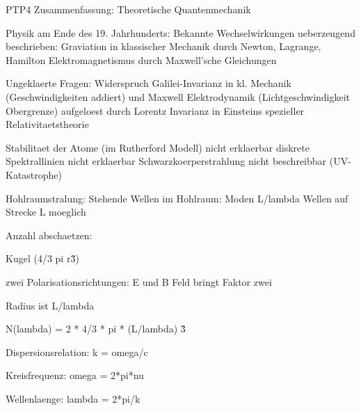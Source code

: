 \documentclass{article}
\begin{document}
\begin{center}
\large
PTP4 Zusammenfassung: Theoretische Quantenmechanik
\end{center}


Physik am Ende des 19. Jahrhunderts: 
Bekannte Wechselwirkungen ueberzeugend beschrieben: 
Graviation in klassischer Mechanik durch Newton, Lagrange, Hamilton
Elektromagnetismus durch Maxwell'sche Gleichungen

Ungeklaerte Fragen: 
Widerspruch Galilei-Invarianz in kl. Mechanik (Geschwindigkeiten addiert) und Maxwell Elektrodynamik (Lichtgeschwindigkeit Obergrenze) aufgeloest durch Lorentz Invarianz in Einsteins spezieller Relativitaetstheorie

Stabilitaet der Atome (im Rutherford Modell) nicht erklaerbar
diskrete Spektrallinien nicht erklaerbar
Schwarzkoerperstrahlung nicht beschreibbar (UV-Katastrophe)

Hohlraumstralung: 
Stehende Wellen im Hohlraum: Moden
L/lambda Wellen auf Strecke L moeglich


Anzahl abschaetzen:


Kugel (4/3 pi r\^3)


zwei Polarisationsrichtungen: E und B Feld bringt Faktor zwei


Radius ist L/lambda 


N(lambda)  = 2 * 4/3 * pi * (L/lambda) \^3


Dispersionsrelation: k = omega/c


Kreisfrequenz: omega = 2*pi*nu


Wellenlaenge: lambda = 2*pi/k
\end{document}
